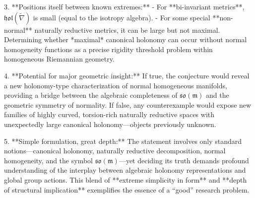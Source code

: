 3. **Positions itself between known extremes:**  
   - For **bi-invariant metrics**, \(\mathfrak{hol}(\tilde{\nabla})\) is small (equal to the isotropy algebra).  
   - For some special **non-normal** naturally reductive metrics, it can be large but not maximal.  
   Determining whether *maximal* canonical holonomy can occur without normal homogeneity functions as a precise rigidity threshold problem within homogeneous Riemannian geometry.

4. **Potential for major geometric insight:**  
   If true, the conjecture would reveal a new holonomy-type characterization of normal homogeneous manifolds, providing a bridge between the algebraic completeness of \(\mathfrak{so}(\mathfrak{m})\) and the geometric symmetry of normality.  
   If false, any counterexample would expose new families of highly curved, torsion-rich naturally reductive spaces with unexpectedly large canonical holonomy—objects previously unknown.

5. **Simple formulation, great depth:**  
   The statement involves only standard notions—canonical holonomy, naturally reductive decomposition, normal homogeneity, and the symbol \(\mathfrak{so}(\mathfrak{m})\)—yet deciding its truth demands profound understanding of the interplay between algebraic holonomy representations and global group actions.  
   This blend of **extreme simplicity in form** and **depth of structural implication** exemplifies the essence of a “good” research problem.